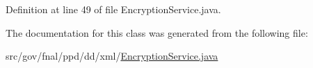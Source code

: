 Definition at line 49 of file Encryption\-Service.\-java.



The documentation for this class was generated from the following file\-:\begin{DoxyCompactItemize}
\item 
src/gov/fnal/ppd/dd/xml/\hyperlink{EncryptionService_8java}{Encryption\-Service.\-java}\end{DoxyCompactItemize}
